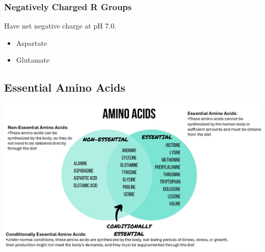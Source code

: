 \documentclass[10pt]{article}
\begin{document}
\subsubsection*{Negatively Charged R Groups}
Have net negative charge at pH 7.0.
\begin{itemize}
    \item Aspartate
    \item Glutamate
\end{itemize}
\subsection*{Essential Amino Acids}
\begin{center}
    \includegraphics[width=\textwidth]{L1_7.png}
\end{center}
\end{document}
